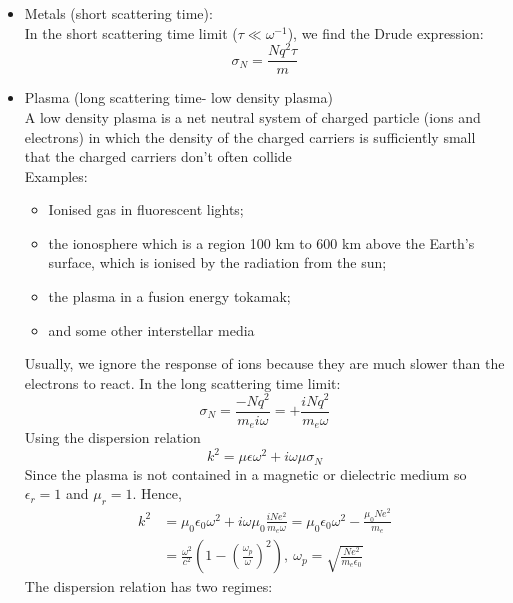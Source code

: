 \documentclass[a4paper, 11pt, normalem]{report}
\newcommand\eno{\epsilon_0}
\newcommand\er{\epsilon_r}
\newcommand\e{\epsilon}
\begin{document}
\begin{itemize}
    \item Metals (short scattering time): \\
    In the short scattering time limit ($\tau \ll \omega^{-1}$), we find the Drude expression:
    \begin{equation}
        \sigma_N = \frac{Nq^2\tau}{m}
    \end{equation}
    \item Plasma (long scattering time- low density plasma) \\
        A low density plasma is a net neutral system of charged particle (ions and electrons) in which the density of the charged carriers is sufficiently small that the charged carriers don't often collide \\
        Examples:
        \begin{itemize}
            \item Ionised gas in fluorescent lights;
            \item the ionosphere which is a region 100 km to 600 km above the Earth's surface, which is ionised by the radiation from the sun;
            \item the plasma in a fusion energy tokamak;
            \item and some other interstellar media
        \end{itemize}
        Usually, we ignore the response of ions because they are much slower than the electrons to react. In the long scattering time limit:
        \begin{equation}
            \sigma_N = \frac{-Nq^2}{m_ei\omega} = +\frac{iNq^2}{m_e\omega}
        \end{equation}
        Using the dispersion relation
        \begin{equation}
            k^2 = \mu\e\omega^2 + i\omega\mu\sigma_N
        \end{equation}
        Since the plasma is not contained in a magnetic or dielectric medium so $\er = 1$ and $\mu_r = 1$. Hence,
        \begin{align}
            k^2 &= \mu_0\eno\omega^2 + i\omega\mu_0\frac{iNe^2}{m_e\omega} = \mu_0\eno\omega^2 - \frac{\mu_0Ne^2}{m_e} \\
                &= \frac{\omega^2}{c^2}\left(1 - \left(\frac{\omega_p}{\omega}\right)^2\right),~ \omega_p = \sqrt{\frac{Ne^2}{m_e\eno}}
        \end{align}
        The dispersion relation has two regimes:
        \begin{enumerate}

\end{enumerate}
\end{itemize}
\end{document}
